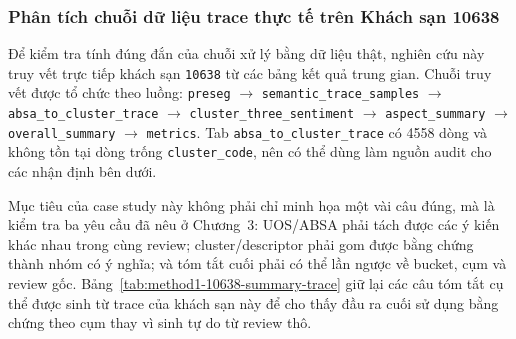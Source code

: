 \subsubsection{Phân tích chuỗi dữ liệu trace thực tế trên Khách sạn 10638}
\label{subsec:method1-hotel-review1-trace}

Để kiểm tra tính đúng đắn của chuỗi xử lý bằng dữ liệu thật, nghiên cứu này
truy vết trực tiếp khách sạn \texttt{10638} từ các bảng kết quả trung gian.
Chuỗi truy vết được tổ chức theo luồng:
\texttt{preseg} $\rightarrow$ \texttt{semantic\_trace\_samples}
$\rightarrow$ \texttt{absa\_to\_cluster\_trace} $\rightarrow$
\texttt{cluster\_three\_sentiment} $\rightarrow$ \texttt{aspect\_summary}
$\rightarrow$ \texttt{overall\_summary} $\rightarrow$ \texttt{metrics}. Tab
\texttt{absa\_to\_cluster\_trace} có \num{4558} dòng và không tồn tại dòng
trống \texttt{cluster\_code}, nên có thể dùng làm nguồn audit cho các nhận
định bên dưới.

Mục tiêu của case study này không phải chỉ minh họa một vài câu đúng, mà là
kiểm tra ba yêu cầu đã nêu ở Chương~3: UOS/ABSA phải tách được các ý kiến khác
nhau trong cùng review; cluster/descriptor phải gom được bằng chứng thành
nhóm có ý nghĩa; và tóm tắt cuối phải có thể lần ngược về bucket, cụm và review
gốc. Bảng~\ref{tab:method1-10638-summary-trace} giữ lại các câu tóm tắt cụ thể
được sinh từ trace của khách sạn này để cho thấy đầu ra cuối sử dụng bằng chứng
theo cụm thay vì sinh tự do từ review thô.

